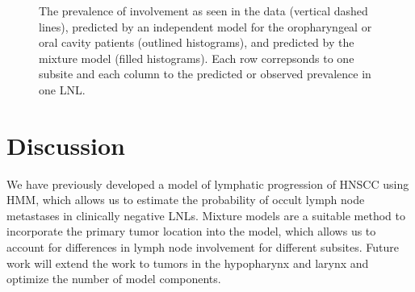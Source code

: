 \documentclass[11pt,twocolumn,twoside]{article}
\begin{document}
\begin{figure}


\caption{\label{fig-prevalence-comparison}The prevalence of involvement
as seen in the data (vertical dashed lines), predicted by an independent
model for the oropharyngeal or oral cavity patients (outlined
histograms), and predicted by the mixture model (filled histograms).
Each row correpsonds to one subsite and each column to the predicted or
observed prevalence in one LNL.}

\end{figure}%

\section{Discussion}\label{sec-discussion}

We have previously developed a model of lymphatic progression of HNSCC
using HMM, which allows us to estimate the probability of occult lymph
node metastases in clinically negative LNLs. Mixture models are a
suitable method to incorporate the primary tumor location into the
model, which allows us to account for differences in lymph node
involvement for different subsites. Future work will extend the work to
tumors in the hypopharynx and larynx and optimize the number of model
components.

\printbibliography
\end{document}
